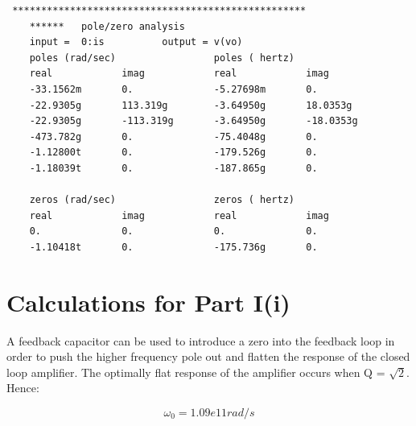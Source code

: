 \documentclass[12pt,a4paper]{article}
\begin{document}
\begin{verbatim}
 ***************************************************
    ******   pole/zero analysis
    input =  0:is          output = v(vo)
    poles (rad/sec)                 poles ( hertz)
    real            imag            real            imag            
    -33.1562m       0.              -5.27698m       0.              
    -22.9305g       113.319g        -3.64950g       18.0353g        
    -22.9305g       -113.319g       -3.64950g       -18.0353g       
    -473.782g       0.              -75.4048g       0.              
    -1.12800t       0.              -179.526g       0.              
    -1.18039t       0.              -187.865g       0.              

    zeros (rad/sec)                 zeros ( hertz)
    real            imag            real            imag            
    0.              0.              0.              0.              
    -1.10418t       0.              -175.736g       0.   

\end{verbatim}

\pagebreak


\section{Calculations for Part I(i)}



A feedback capacitor can be used to introduce a zero into the feedback loop in
order to push the higher frequency pole out and flatten the response of the
closed loop amplifier. The optimally flat response of the amplifier occurs when Q = $\sqrt{2}$. Hence:

\begin{equation}
  \omega_0 = 1.09e11 rad/s
\end{equation}
\end{document}
